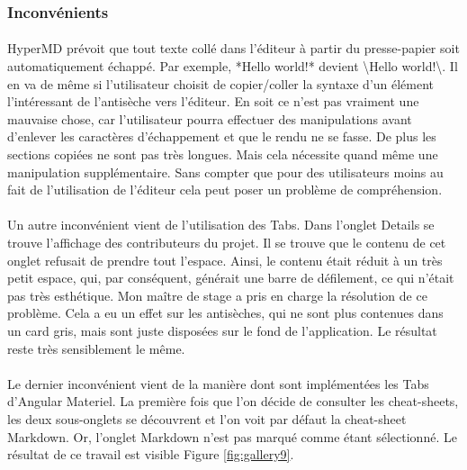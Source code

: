 \documentclass[12pt]{article}
\begin{document}
\subsubsection{Inconvénients}
\paragraph{}
HyperMD prévoit que tout texte collé dans l'éditeur à partir du presse-papier soit automatiquement échappé. Par exemple, *Hello world!* devient \textbackslash*Hello world!\textbackslash*. Il en va de même si l'utilisateur choisit de copier/coller la syntaxe d'un élément l'intéressant de l'antisèche vers l'éditeur. En soit ce n'est pas vraiment une mauvaise chose, car l'utilisateur pourra effectuer des manipulations avant d'enlever les caractères d'échappement et que le rendu ne se fasse. De plus les sections copiées ne sont pas très longues. Mais cela nécessite quand même une manipulation supplémentaire. Sans compter que pour des utilisateurs moins au fait de l'utilisation de l'éditeur cela peut poser un problème de compréhension.
\paragraph{}
Un autre inconvénient vient de l'utilisation des Tabs. Dans l'onglet Details se trouve l'affichage des contributeurs du projet. Il se trouve que le contenu de cet onglet refusait de prendre tout l'espace. Ainsi, le contenu était réduit à un très petit espace, qui, par conséquent, générait une barre de défilement, ce qui n'était pas très esthétique. Mon maître de stage a pris en charge la résolution de ce problème. Cela a eu un effet sur les antisèches, qui ne sont plus contenues dans un card gris, mais sont juste disposées sur le fond de l'application. Le résultat reste très sensiblement le même.
\paragraph{}
Le dernier inconvénient vient de la manière dont sont implémentées les Tabs d'Angular Materiel. La première fois que l'on décide de consulter les cheat-sheets, les deux sous-onglets se découvrent et l'on voit par défaut la cheat-sheet Markdown. Or, l'onglet Markdown n'est pas marqué comme étant sélectionné. Le résultat de ce travail est visible Figure \ref{fig:gallery9}.
\end{document}
